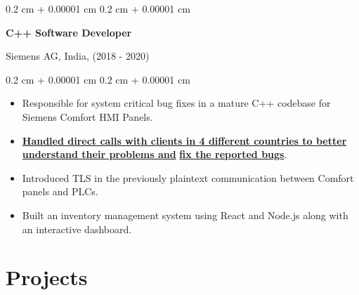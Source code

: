 \documentclass[10pt, letterpaper]{article}
\newenvironment{highlights}{
    \begin{itemize}[
        topsep=0.10 cm,
        parsep=0.10 cm,
        partopsep=0pt,
        itemsep=0pt,
        leftmargin=0.4 cm + 10pt
    ]
}{
    \end{itemize}
} %
\newenvironment{onecolentry}{
    \begin{adjustwidth}{
        0.2 cm + 0.00001 cm
    }{
        0.2 cm + 0.00001 cm
    }
}{
    \end{adjustwidth}
} %
\newcommand{\ubf}[1]{\underline{\textbf{#1}}}
\begin{document}
        \vspace{0.3 cm}

        \begin{samepage}

        \begin{onecolentry}
            \textbf{C++ Software Developer}
            
            Siemens AG, India, (2018 - 2020)
        \end{onecolentry}

        \vspace{0.10 cm}
        \begin{onecolentry}
            \begin{highlights}
                \item Responsible for system critical bug fixes in a {mature C++ codebase} {for Siemens Comfort HMI Panels}.
                \item \ubf{Handled direct calls with clients in 4 different countries to better understand their problems and} \ubf{fix the reported bugs}. 
                \item {Introduced TLS} in the previously plaintext communication between Comfort panels and PLCs.
                \item Built an inventory management system using {React and Node.js along with an interactive dashboard}.
            \end{highlights}
        \end{onecolentry}

        \end{samepage}





\section{Projects}
\end{document}
